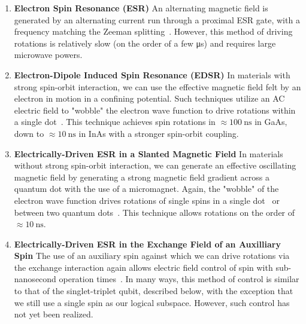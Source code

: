 \begin{enumerate}
  \item \textbf{Electron Spin Resonance (ESR)} An alternating magnetic field is generated by an alternating current run through a proximal ESR gate,
        with a frequency matching the Zeeman splitting~\cite{nnano.2014.216}. However, this method of driving rotations is relatively
        slow (on the order of a few \si{\micro\second}) and requires large microwave powers.
  \item \textbf{Electron-Dipole Induced Spin Resonance (EDSR)} In materials with strong spin-orbit interaction, we can
        use the effective magnetic field felt by an electron in motion in a confining potential. Such techniques utilize an AC electric
        field to "wobble" the electron wave function to drive rotations within a single dot~\cite{Nowack1430,nature11559}. This technique
        achieves spin rotations in $\approx \SI{100}{\nano\second}$ in GaAs, down to $\approx \SI{10}{\nano\second}$ in InAs with a stronger spin-orbit coupling.
  \item \textbf{Electrically-Driven ESR in a Slanted Magnetic Field} In materials without strong spin-orbit interaction,
        we can generate an effective oscillating magnetic field by generating a strong magnetic field gradient across a quantum dot with the use of a micromagnet.
        Again, the "wobble" of the electron wave function drives rotations of single spins in a single dot~\cite{PhysRevLett.107.146801}
        or between two quantum dots~\cite{2019arXiv190500346C}. This technique allows rotations on the order of $\approx \SI{10}{\nano\second}$.
  \item \textbf{Electrically-Driven ESR in the Exchange Field of an Auxilliary Spin} The use of an auxiliary spin against
        which we can drive rotations via the exchange interaction again  allows electric field control of spin with sub-nanosecond operation times~\cite{PhysRevB.90.235311}.
        In many ways, this method of control is similar to that of the singlet-triplet qubit, described below, with the exception that we still use a single
        spin as our logical subspace. However, such control has not yet been realized.
\end{enumerate}

